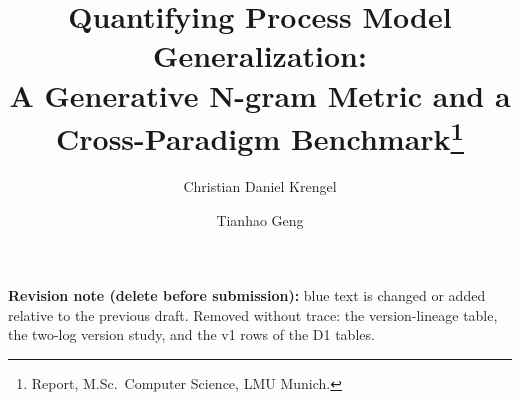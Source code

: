 \documentclass[runningheads]{llncs}
\begin{document}
\title{Quantifying Process Model Generalization:\\
A Generative N-gram Metric and a Cross-Paradigm Benchmark\thanks{Report, M.Sc.\ Computer Science, LMU Munich.}}

\author{Christian Daniel Krengel \and Tianhao Geng}

\maketitle

{\color{chgblue}\noindent\footnotesize\textbf{Revision note (delete before submission):} blue text is changed or added relative to the previous draft. Removed without trace: the version-lineage table, the two-log version study, and the v1 rows of the D1 tables.\par}\vspace{2mm}
\end{document}

